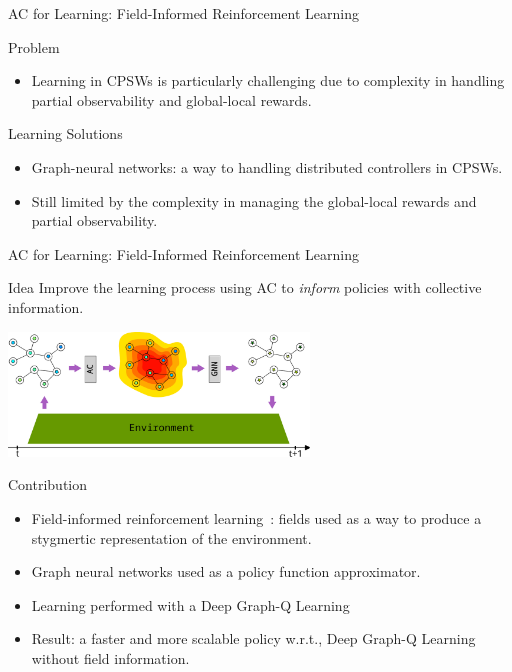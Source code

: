 \documentclass[presentation, 9pt,169]{beamer}\mode<presentation>{\usetheme{AMSBolognaFC}}
\begin{document}
\begin{frame}{AC for Learning: Field-Informed Reinforcement Learning}
\begin{block}{Problem}
\begin{itemize}
  \item Learning in CPSWs is particularly challenging due to complexity in handling partial observability and global-local rewards. 
\end{itemize}
\end{block}
\begin{alertblock}{Learning Solutions}
  \begin{itemize}
    \item Graph-neural networks: a way to handling distributed controllers in CPSWs.
    \item Still limited by the complexity in managing the global-local rewards and partial observability.
  \end{itemize}
\end{alertblock}
\end{frame}
\begin{frame}{AC for Learning: Field-Informed Reinforcement Learning}
\begin{alertblock}{Idea}
  Improve the learning process using AC to \emph{inform} policies with collective information.
\end{alertblock}
\begin{center}
  \includegraphics[width=0.6\textwidth]{img/architecture.pdf}
\end{center}
\begin{exampleblock}{Contribution}
  \begin{itemize}
    \item Field-informed reinforcement learning~\cite{acgnn}: fields used as a way to produce a stygmertic representation of the environment.
    \item Graph neural networks used as a policy function approximator.
    \item Learning performed with a Deep Graph-Q Learning
    \item Result: a faster and more scalable policy w.r.t., Deep Graph-Q Learning without field information.
  \end{itemize}
\end{exampleblock}
\end{frame}
\end{document}
